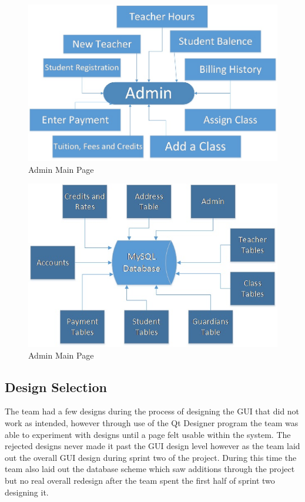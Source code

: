 \begin{figure}
  \includegraphics[width=\linewidth]{pics/AdminFunctions.jpg}
  \caption{Admin Main Page}
  \label{fig: Admin Functions}
\end{figure}

\begin{figure}
  \includegraphics[width=\linewidth]{DatabaseDiagram.jpg}
  \caption{Admin Main Page}
  \label{fig: Database Tables}
\end{figure}
 
\subsection{Design Selection}
The team had a few designs during the process of designing the GUI that did not work as intended, however through use of the Qt Designer program the team was able to experiment with designs until a page felt usable within the system. The rejected designs never made it past the GUI design level however as the team laid out the overall GUI design during sprint two of the project. During this time the team also laid out the database scheme which saw additions through the project but no real overall redesign after the team spent the first half of sprint two designing it.
  
